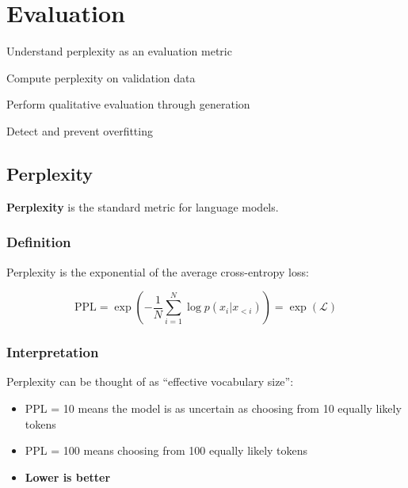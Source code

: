 \chapter{Evaluation}
\label{ch:evaluation}

\begin{objectives}
    \item Understand perplexity as an evaluation metric
    \item Compute perplexity on validation data
    \item Perform qualitative evaluation through generation
    \item Detect and prevent overfitting
\end{objectives}

\section{Perplexity}

\textbf{Perplexity} is the standard metric for language models.

\subsection{Definition}

Perplexity is the exponential of the average cross-entropy loss:

\begin{equation}
\text{PPL} = \exp\left(-\frac{1}{N}\sum_{i=1}^{N} \log p(x_i | x_{<i})\right) = \exp(\mathcal{L})
\end{equation}

\subsection{Interpretation}

Perplexity can be thought of as ``effective vocabulary size'':
\begin{itemize}
    \item PPL = 10 means the model is as uncertain as choosing from 10 equally likely tokens
    \item PPL = 100 means choosing from 100 equally likely tokens
    \item \textbf{Lower is better}
\end{itemize}

